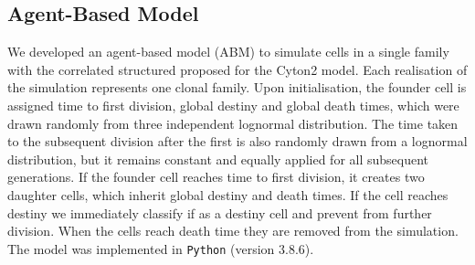 \documentclass[11pt, a4paper]{article}
\begin{document}
\subsection{Agent-Based Model}
We developed an agent-based model (ABM) to simulate cells in a single family with the correlated structured proposed for the Cyton2 model. Each realisation of the simulation represents one clonal family. Upon initialisation, the founder cell is assigned time to first division, global destiny and global death times, which were drawn randomly from three independent lognormal distribution. The time taken to the subsequent division after the first is also randomly drawn from a lognormal distribution, but it remains constant and equally applied for all subsequent generations. If the founder cell reaches time to first division, it creates two daughter cells, which inherit global destiny and death times. 
If the cell reaches destiny we immediately classify if as a destiny cell and prevent from further division. When the cells reach death time they are removed from the simulation. The model was implemented in \verb+Python+ (version 3.8.6).


\nolinenumbers
\end{document}
